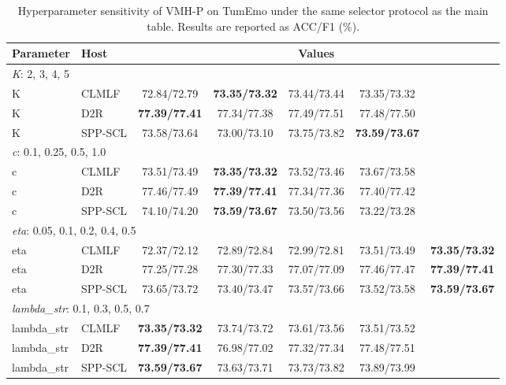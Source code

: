 \begin{table}[t]
\centering
\caption{Hyperparameter sensitivity of VMH-P on TumEmo under the same selector protocol as the main table. Results are reported as ACC/F1 (\%).}
\label{tab:hyper_sensitivity_maincfg}
\scriptsize
\renewcommand{\arraystretch}{0.95}
\setlength{\tabcolsep}{3.6pt}
\begin{tabular}{llccccc}
\toprule
\textbf{Parameter} & \textbf{Host} & \multicolumn{5}{c}{\textbf{Values}} \\
\midrule
\multicolumn{7}{l}{\textit{K}: 2, 3, 4, 5} \\
K & CLMLF & 72.84/72.79 & \textbf{73.35/73.32} & 73.44/73.44 & 73.35/73.32 &  \\
K & D2R & \textbf{77.39/77.41} & 77.34/77.38 & 77.49/77.51 & 77.48/77.50 &  \\
K & SPP-SCL & 73.58/73.64 & 73.00/73.10 & 73.75/73.82 & \textbf{73.59/73.67} &  \\
\midrule
\multicolumn{7}{l}{\textit{c}: 0.1, 0.25, 0.5, 1.0} \\
c & CLMLF & 73.51/73.49 & \textbf{73.35/73.32} & 73.52/73.46 & 73.67/73.58 &  \\
c & D2R & 77.46/77.49 & \textbf{77.39/77.41} & 77.34/77.36 & 77.40/77.42 &  \\
c & SPP-SCL & 74.10/74.20 & \textbf{73.59/73.67} & 73.50/73.56 & 73.22/73.28 &  \\
\midrule
\multicolumn{7}{l}{\textit{eta}: 0.05, 0.1, 0.2, 0.4, 0.5} \\
eta & CLMLF & 72.37/72.12 & 72.89/72.84 & 72.99/72.81 & 73.51/73.49 & \textbf{73.35/73.32} \\
eta & D2R & 77.25/77.28 & 77.30/77.33 & 77.07/77.09 & 77.46/77.47 & \textbf{77.39/77.41} \\
eta & SPP-SCL & 73.65/73.72 & 73.40/73.47 & 73.57/73.66 & 73.52/73.58 & \textbf{73.59/73.67} \\
\midrule
\multicolumn{7}{l}{\textit{lambda_str}: 0.1, 0.3, 0.5, 0.7} \\
lambda_str & CLMLF & \textbf{73.35/73.32} & 73.74/73.72 & 73.61/73.56 & 73.51/73.52 &  \\
lambda_str & D2R & \textbf{77.39/77.41} & 76.98/77.02 & 77.32/77.34 & 77.48/77.51 &  \\
lambda_str & SPP-SCL & \textbf{73.59/73.67} & 73.63/73.71 & 73.73/73.82 & 73.89/73.99 &  \\
\bottomrule
\end{tabular}
\end{table}
